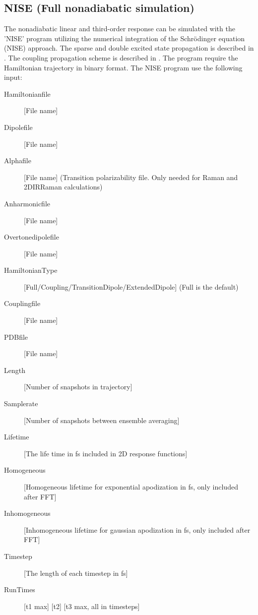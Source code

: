 \subsection{NISE (Full nonadiabatic simulation)}
The nonadiabatic linear and third-order response can be simulated with the 'NISE' program utilizing the numerical integration of the Schr\"odinger equation (NISE) approach\cite{Jansen.2006.JPCB.110.22910,Jansen.2009.ACR.42.1405}. The sparse and double excited state propagation is described in \cite{Jansen.2010.JCP.132.224503}.
The coupling propagation scheme is described in \cite{Liang.2012.JCTC.8.1706}.
The program require the Hamiltonian trajectory in binary format.
The NISE program use the following input:\\
\begin{description}
\item [Hamiltonianfile] [File name]
\item [Dipolefile] [File name]
\item [Alphafile] [File name] (Transition polarizability file. Only needed for Raman and 2DIRRaman calculations)
\item [Anharmonicfile] [File name]
\item [Overtonedipolefile] [File name]
\item [HamiltonianType] [Full/Coupling/TransitionDipole/ExtendedDipole] (Full is the default)
\item [Couplingfile] [File name]
\item [PDBfile] [File name]
\item [Length] [Number of snapshots in trajectory] 
\item [Samplerate] [Number of snapshots between ensemble averaging]
\item [Lifetime] [The life time in fs included in 2D response functions]
\item [Homogeneous] [Homogeneous lifetime for exponential apodization in fs, only included after FFT]
\item [Inhomogeneous] [Inhomogeneous lifetime for gaussian apodization in fs, only included after FFT]
\item [Timestep] [The length of each timestep in fs]
\item [RunTimes] [t1 max] [t2] [t3 max, all in timesteps]

\end{description}
